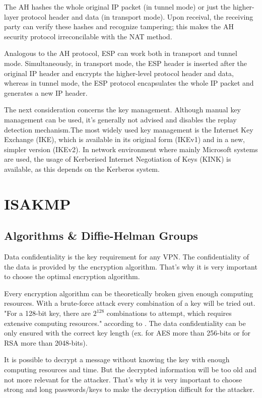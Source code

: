 \documentclass[a4paper]{report}
\begin{document}
The AH hashes the whole original IP packet (in tunnel mode) or just the higher-layer protocol header and data (in transport mode). Upon receival, the receiving party can verify these hashes and recognize tampering; this makes the AH security protocol irreconcilable with the NAT method. \parencite[2-11]{Kent2005AH}

Analogous to the AH protocol, ESP can work both in transport and tunnel mode. Simultaneously, in transport mode, the ESP header is inserted after the original IP header and encrypts the higher-level protocol header and data, whereas in tunnel mode, the ESP protocol encapsulates the whole IP packet and generates a new IP header. \parencite[18-20]{Kent2005ESP}

The next consideration concerns the key management. Although manual key management can be used, it's generally not advised and disables the replay detection mechanism.The most widely used key management is the Internet Key Exchange (IKE), which is available in its original form (IKEv1) and in a new, simpler version (IKEv2). In network environment where mainly Microsoft systems are used, the usage of Kerberised Internet Negotiation of Keys (KINK) is available, as this depends on the Kerberos system. \parencite[4-5]{Bellovin2009}

\section{ISAKMP}
\label{sec:ISAKMP}

\subsection{Algorithms \& Diffie-Helman Groups}
\label{ssec:AlgoDH}
Data confidentiality is the key requirement for any VPN. The confidentiality of the data is provided by the encryption algorithm. That's why it is very important to choose the optimal encryption algorithm. \parencite{Snader2006}

Every encryption algorithm can be theoretically broken given enough computing resources. With a brute-force attack every combination of a key will be tried out. "For a 128-bit key, there are $2^{128}$ combinations to attempt, which requires extensive computing resources." according to \citeauthor{HigashiMichael2013}. 
The data confidentiality can be only ensured with the correct key length (ex. for AES more than 256-bits or for RSA more than 2048-bits). 

It is possible to decrypt a message without knowing the key with enough computing resources and time. But the decrypted information will be too old and not more relevant for the attacker. 
That's why it is very important to choose strong and long passwords/keys to make the decryption difficult for the attacker.\parencite{HigashiMichael2013}
\end{document}

